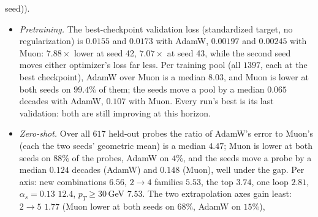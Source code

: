 \documentclass[11pt]{article}
\begin{document}
seed)).
\begin{itemize}
  \item \emph{Pretraining.} The best-checkpoint validation loss (standardized target, no regularization) is
    $0.0155$ and $0.0173$ with AdamW, $0.00197$ and $0.00245$ with Muon: $7.88\times$ lower at seed 42, $7.07\times$
    at seed 43, while the second seed moves either optimizer's loss far less. Per training pool
    (all $1397$, each at the best checkpoint), AdamW over Muon is a median $8.03$, and Muon is lower at both seeds on
    $99.4\%$ of them; the seeds move a pool by a median $0.065$ decades with AdamW, $0.107$ with Muon. Every run's best
    is its last validation: both are still improving at this horizon.
  \item \emph{Zero-shot.}
    Over all $617$ held-out probes the ratio of AdamW's error to Muon's (each the two seeds'
    geometric mean) is a median $4.47$; Muon is lower at both seeds on $88\%$ of the probes, AdamW on $4\%$, and the
    seeds move a probe by a median $0.124$ decades (AdamW) and $0.148$ (Muon), well under the gap. Per axis: new
    combinations $6.56$, $2\to4$ families $5.53$, the top $3.74$, one loop $2.81$, $\alpha_s=0.13$ $12.4$, $p_T\geq30$\,GeV
    $7.53$. The two extrapolation axes gain least: $2\to5$ $1.77$ (Muon lower at both seeds on $68\%$, AdamW on $15\%$),

\end{itemize}
\end{document}
